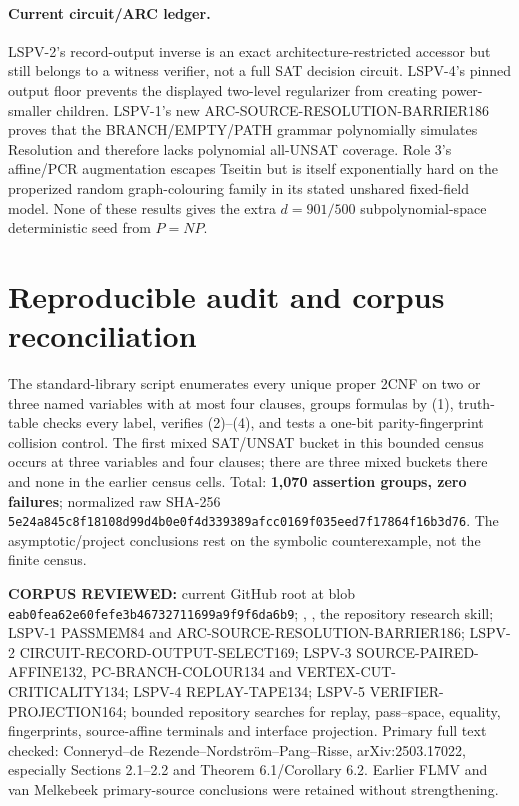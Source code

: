 \documentclass[11pt]{article}
\begin{document}
\paragraph{Current circuit/ARC ledger.}
LSPV-2's record-output inverse is an exact architecture-restricted accessor but still belongs
to a witness verifier, not a full SAT decision circuit.  LSPV-4's pinned output floor prevents
the displayed two-level regularizer from creating power-smaller children.  LSPV-1's new
ARC-SOURCE-RESOLUTION-BARRIER186 proves that the BRANCH/EMPTY/PATH grammar polynomially
simulates Resolution and therefore lacks polynomial all-UNSAT coverage.  Role 3's affine/PCR
augmentation escapes Tseitin but is itself exponentially hard on the properized random
graph-colouring family in its stated unshared fixed-field model.  None of these results gives
the extra $d=901/500$ subpolynomial-space deterministic seed from $P=NP$.

\section{Reproducible audit and corpus reconciliation}
The standard-library script
enumerates every unique proper 2CNF on two or three named variables with at most four clauses,
groups formulas by (1), truth-table checks every label, verifies (2)--(4), and tests a one-bit
parity-fingerprint collision control.  The first mixed SAT/UNSAT bucket in this bounded census
occurs at three variables and four clauses; there are three mixed buckets there and none in the
earlier census cells.  Total: \textbf{1,070 assertion groups, zero failures}; normalized raw SHA-256
\texttt{5e24a845c8f18108d99d4b0e0f4d339389afcc0169f035eed7f17864f16b3d76}.
The asymptotic/project conclusions rest on the symbolic counterexample, not the finite census.

\noindent\textbf{CORPUS REVIEWED:} current GitHub root  at blob
\texttt{eab0fea62e60fefe3b46732711699a9f9f6da6b9}; ,
, the repository research skill; LSPV-1 PASSMEM84 and
ARC-SOURCE-RESOLUTION-BARRIER186; LSPV-2 CIRCUIT-RECORD-OUTPUT-SELECT169;
LSPV-3 SOURCE-PAIRED-AFFINE132, PC-BRANCH-COLOUR134 and
VERTEX-CUT-CRITICALITY134; LSPV-4 REPLAY-TAPE134; LSPV-5
VERIFIER-PROJECTION164; bounded repository searches for replay, pass--space, equality,
fingerprints, source-affine terminals and interface projection.  Primary full text checked:
Conneryd--de Rezende--Nordstr\"om--Pang--Risse, arXiv:2503.17022, especially
Sections 2.1--2.2 and Theorem 6.1/Corollary 6.2.  Earlier FLMV and van Melkebeek
primary-source conclusions were retained without strengthening.
\end{document}

